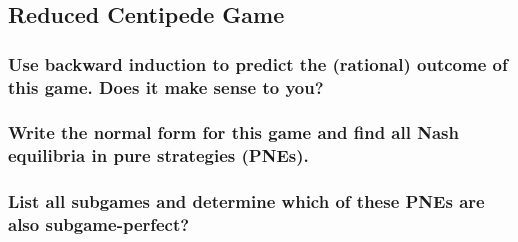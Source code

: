 \subsection{Reduced Centipede Game}
\subsubsection{Use backward induction to predict the (rational) outcome of this game. Does it make sense to you?}
\subsubsection{Write the normal form for this game and find all Nash equilibria in pure strategies (PNEs).}
\subsubsection{List all subgames and determine which of these PNEs are also subgame-perfect?}